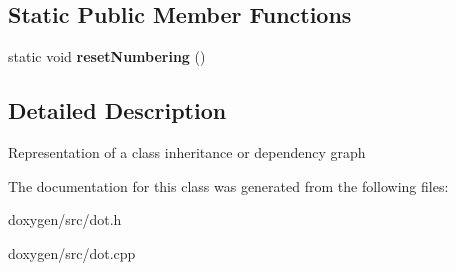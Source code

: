 \subsection*{Static Public Member Functions}
\begin{DoxyCompactItemize}
\item 
\mbox{\label{class_dot_class_graph_a93af71bc3c04c5f65ec470a51899056b}} 
static void {\bfseries reset\+Numbering} ()
\end{DoxyCompactItemize}


\subsection{Detailed Description}
Representation of a class inheritance or dependency graph 

The documentation for this class was generated from the following files\+:\begin{DoxyCompactItemize}
\item 
doxygen/src/dot.\+h\item 
doxygen/src/dot.\+cpp\end{DoxyCompactItemize}

